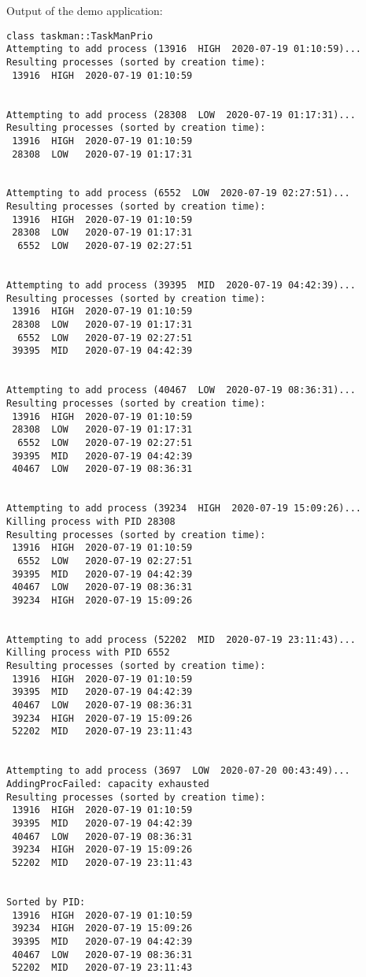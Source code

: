 \documentclass[a4paper]{scrartcl}
\begin{document}
Output of the demo application:
\begin{verbatim}
class taskman::TaskManPrio
Attempting to add process (13916  HIGH  2020-07-19 01:10:59)...
Resulting processes (sorted by creation time):
 13916  HIGH  2020-07-19 01:10:59


Attempting to add process (28308  LOW  2020-07-19 01:17:31)...
Resulting processes (sorted by creation time):
 13916  HIGH  2020-07-19 01:10:59
 28308  LOW   2020-07-19 01:17:31


Attempting to add process (6552  LOW  2020-07-19 02:27:51)...
Resulting processes (sorted by creation time):
 13916  HIGH  2020-07-19 01:10:59
 28308  LOW   2020-07-19 01:17:31
  6552  LOW   2020-07-19 02:27:51


Attempting to add process (39395  MID  2020-07-19 04:42:39)...
Resulting processes (sorted by creation time):
 13916  HIGH  2020-07-19 01:10:59
 28308  LOW   2020-07-19 01:17:31
  6552  LOW   2020-07-19 02:27:51
 39395  MID   2020-07-19 04:42:39


Attempting to add process (40467  LOW  2020-07-19 08:36:31)...
Resulting processes (sorted by creation time):
 13916  HIGH  2020-07-19 01:10:59
 28308  LOW   2020-07-19 01:17:31
  6552  LOW   2020-07-19 02:27:51
 39395  MID   2020-07-19 04:42:39
 40467  LOW   2020-07-19 08:36:31


Attempting to add process (39234  HIGH  2020-07-19 15:09:26)...
Killing process with PID 28308
Resulting processes (sorted by creation time):
 13916  HIGH  2020-07-19 01:10:59
  6552  LOW   2020-07-19 02:27:51
 39395  MID   2020-07-19 04:42:39
 40467  LOW   2020-07-19 08:36:31
 39234  HIGH  2020-07-19 15:09:26


Attempting to add process (52202  MID  2020-07-19 23:11:43)...
Killing process with PID 6552
Resulting processes (sorted by creation time):
 13916  HIGH  2020-07-19 01:10:59
 39395  MID   2020-07-19 04:42:39
 40467  LOW   2020-07-19 08:36:31
 39234  HIGH  2020-07-19 15:09:26
 52202  MID   2020-07-19 23:11:43


Attempting to add process (3697  LOW  2020-07-20 00:43:49)...
AddingProcFailed: capacity exhausted
Resulting processes (sorted by creation time):
 13916  HIGH  2020-07-19 01:10:59
 39395  MID   2020-07-19 04:42:39
 40467  LOW   2020-07-19 08:36:31
 39234  HIGH  2020-07-19 15:09:26
 52202  MID   2020-07-19 23:11:43


Sorted by PID:
 13916  HIGH  2020-07-19 01:10:59
 39234  HIGH  2020-07-19 15:09:26
 39395  MID   2020-07-19 04:42:39
 40467  LOW   2020-07-19 08:36:31
 52202  MID   2020-07-19 23:11:43



\end{verbatim}
\end{document}
